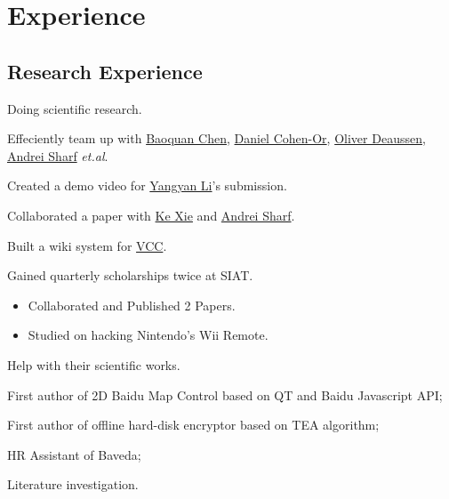 \documentclass[11pt,a4paper,nolmodern]{moderncv}
\begin{document}
\section{Experience}
\subsection{Research Experience}


{Doing scientific research.
\begin{tightitemize}%
 \item Effeciently team up with \href{http://web.siat.ac.cn/~baoquan/}{Baoquan Chen}, \href{http://www.math.tau.ac.il/~dcor/}{Daniel Cohen-Or}, \href{http://graphics.uni-konstanz.de/mitarbeiter/deussen.php}{Oliver Deaussen}, \href{http://www.idav.ucdavis.edu/~asharf/}{Andrei Sharf} \textsl{et.al}.
 \item Created a demo video for \href{http://web.siat.ac.cn/~yangyan/}{Yangyan Li}'s submission.
 \item Collaborated a paper with \href{http://web.siat.ac.cn/~kexie}{Ke Xie} and
   \href{http://www.idav.ucdavis.edu/~asharf/}{Andrei Sharf}.
 \item Built a wiki system for
   \href{http://vcc.siat.ac.cn/w/index.php/Main_Page}{VCC}.   
 \item Gained quarterly scholarships twice at SIAT.
 \end{tightitemize}}

%
  {
\begin{itemize}
 \item Collaborated and Published 2 Papers.
 \item Studied on hacking Nintendo's Wii Remote.
\end{itemize}}

{Help with their scientific works.
\begin{tightitemize}%
 \item First author of 2D Baidu Map Control based on QT and Baidu Javascript
   API;
 \item First author of offline hard-disk encryptor based on TEA algorithm;
 \item HR Assistant of Baveda;
 \item Literature investigation.
 \end{tightitemize}}
\end{document}
